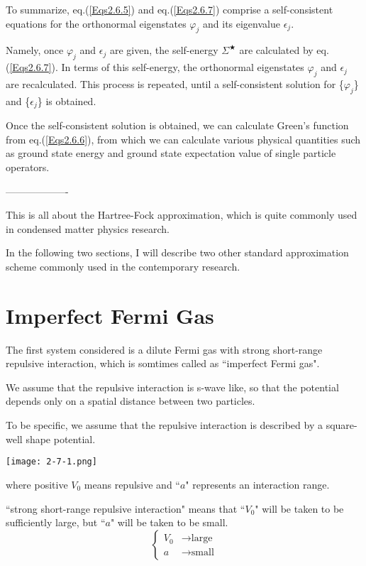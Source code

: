 To summarize, eq.(\ref{Eqs2.6.5}) and eq.(\ref{Eqs2.6.7}) comprise a self-consistent equations for the orthonormal eigenstates $\varphi_j$ and its eigenvalue $\epsilon_j$.

Namely, once  $\varphi_j$ and $\epsilon_j$ are given, the self-energy $\Sigma^\bigstar$ are calculated by eq.(\ref{Eqs2.6.7}). In terms of this self-energy, the orthonormal eigenstates $\varphi_j$ and $\epsilon_j$ are recalculated. This process is repeated, until a self-consistent solution for \{$\varphi_j$\} and \{$\epsilon_j$\} is obtained.

Once the self-consistent solution is obtained, we can calculate Green's function from eq.(\ref{Eqs2.6.6}), from which we can calculate various physical quantities such as ground state energy and ground state expectation value of single particle operators.
\begin{center}-------------------\end{center}

This is all about the Hartree-Fock approximation, which is quite commonly used in condensed matter physics research.

In the following two sections, I will describe two other standard approximation scheme commonly used in the contemporary research.

\section{Imperfect Fermi Gas}%
The first system considered is a dilute Fermi gas with strong short-range repulsive interaction, which is somtimes called as ``imperfect Fermi gas".

We assume that the repulsive interaction is s-wave like, so that the potential depends only on a spatial distance between two particles.

To be specific, we assume that the repulsive interaction is described by a square-well shape potential.
\begin{center} \label{Fig2.7.1} \texttt{[image: 2-7-1.png]}
\end{center}
where positive $V_0$ means repulsive and ``$a$" represents an interaction range.

``strong short-range repulsive interaction" means that ``$V_0$" will be taken to be sufficiently large, but ``$a$" will be taken to be small.
\[ \left \{ \begin{split} V_0 &\rightarrow \text{large} \\ a &\rightarrow \text{small} \end{split} \right. \]

